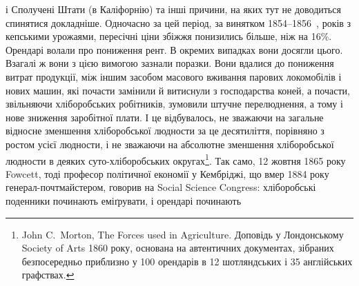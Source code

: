 і Сполучені Штати (в Каліфорнію) та інші причини, на яких тут не доводиться
спинятися докладніше. Одночасно за цей період, за винятком 1854--1856~, років
з кепськими урожаями, пересічні ціни збіжжя понизились більше, ніж на 16\%.
Орендарі волали про пониження рент. В окремих випадках вони досягли цього.
Взагалі ж вони з цією вимогою зазнали поразки. Вони вдалися до пониження
витрат продукції, між іншим засобом масового вживання парових
локомобілів і нових машин, які почасти замінили й витиснули з господарства
коней, а почасти, звільняючи хліборобських робітників, зумовили
штучне перелюднення, а тому і нове зниження заробітної плати. І це відбувалось,
не зважаючи на загальне відносне зменшення хліборобської людности за це
десятиліття, порівняно з ростом усієї людности, і не зважаючи на абсолютне зменшення
хліборобської людности в деяких суто-хліборобських округах\footnote{
John C.~Morton, The Forces used in Agriculture. Доповідь у Лондонському Society of Arts 1860
року, основана на автентичних документах, зібраних безпосередньо приблизно у 100 орендарів в 12
шотляндських і 35 англійських графствах.
}. Так
само, 12 жовтня 1865 року Fowcett, тоді професор політичної економії у Кембріджі,
що вмер 1884 року генерал-почтмайстером, говорив на Social Science
Congress: хліборобські поденники починають еміґрувати, і орендарі починають
\parbreak{}  %
